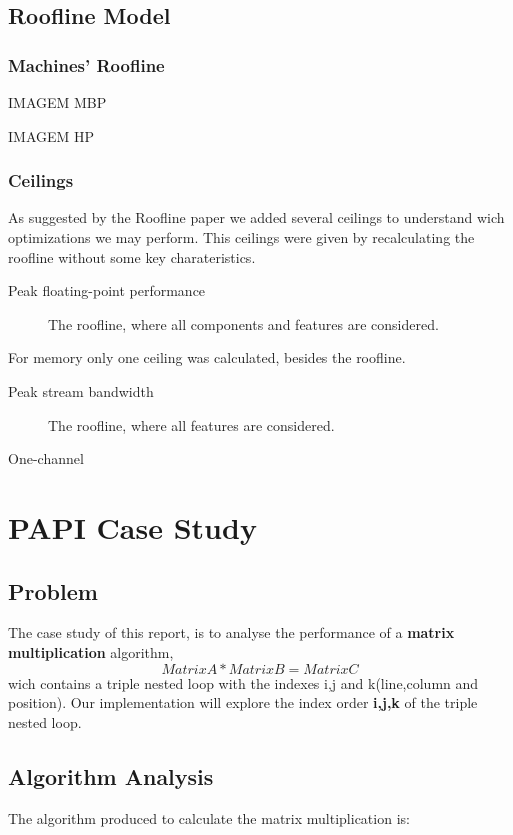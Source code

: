 \documentclass[a4paper,10pt,openright,openbib]{article}
\begin{document}
\subsection{Roofline Model}
\subsubsection{Machines' Roofline}
IMAGEM MBP

IMAGEM HP

\subsubsection{Ceilings}
As suggested by the Roofline paper we added several ceilings to understand wich optimizations we may perform.
This ceilings were given by recalculating the roofline without some key charateristics.
\begin{description}
\item[Peak floating-point performance] The roofline, where all components and features are considered.
\item[]
\item[]
\item[]
\end{description}
For memory only one ceiling was calculated, besides the roofline.
\begin{description}
\item[Peak stream bandwidth] The roofline, where all features are considered.
\item[One-channel]
\end{description}

\section{PAPI Case Study}
\subsection{Problem}
The case study of this report, is to analyse the performance of a \textbf{matrix multiplication} algorithm, \begin{equation}Matrix A * Matrix B = Matrix C\end{equation} wich contains a triple nested loop with the indexes i,j and k(line,column and position). Our implementation will explore the index order \textbf{i,j,k} of the triple nested loop.

\subsection{Algorithm Analysis}
The algorithm produced to calculate the matrix multiplication is:
\end{document}
